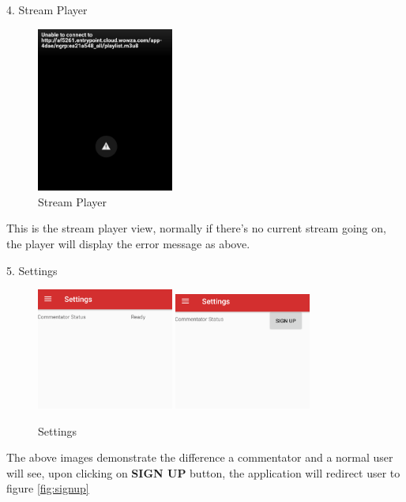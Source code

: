 \documentclass{article}
\begin{document}
\begin{flushleft}
{\large 4. Stream Player}\par
\begin{figure}[H]
	\centering
	\includegraphics[width=0.40\textwidth]{player}
	\caption{Stream Player}
	\label{fig:player}
\end{figure}
This is the stream player view, normally if there's no current stream going on, the player will display the error message as above.\par
{\large 5. Settings}\par
\begin{figure}[H]
	\includegraphics[width=0.40\textwidth]{settings}
	\hfill
	\includegraphics[width=0.40\textwidth]{settings2}
	\caption{Settings}
	\label{fig:settings}
\end{figure}
The above images demonstrate the difference a commentator and a normal user will see, upon clicking on \textbf{SIGN UP} button, the application will redirect user to figure \ref{fig:signup}
\begin{figure}[H]

\end{figure}
\end{flushleft}
\end{document}
